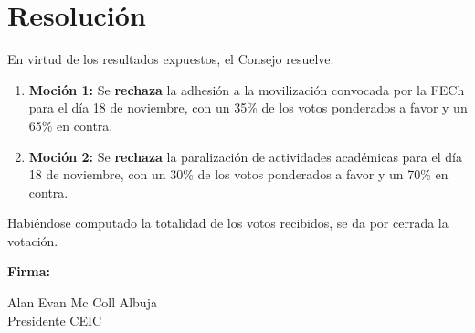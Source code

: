 \documentclass[12pt,letterpaper]{article}
\begin{document}
\section{Resolución}

En virtud de los resultados expuestos, el Consejo resuelve:

\begin{enumerate}
  \item \textbf{Moción 1:} Se \textbf{rechaza} la adhesión a la movilización convocada por la FECh para el día 18 de noviembre, con un 35\% de los votos ponderados a favor y un 65\% en contra.
  \item \textbf{Moción 2:} Se \textbf{rechaza} la paralización de actividades académicas para el día 18 de noviembre, con un 30\% de los votos ponderados a favor y un 70\% en contra.
\end{enumerate}

\vspace{0.5em}

Habiéndose computado la totalidad de los votos recibidos, se da por cerrada la votación.

\vspace{2.5em}

\noindent\textbf{Firma:}

\vspace{3em}

\noindent Alan Evan Mc Coll Albuja\\
Presidente CEIC
\end{document}
